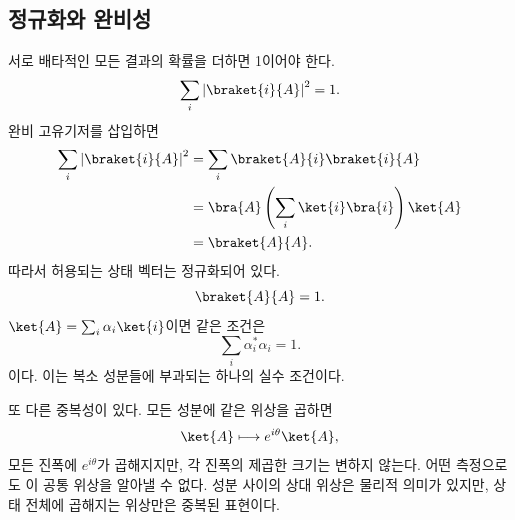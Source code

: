 \begin{classroomqa}\end{classroomqa}

\subsection{정규화와 완비성}

서로 배타적인 모든 결과의 확률을 더하면 1이어야 한다.
\begin{equation}
\sum_i\left|\braket{i}{A}\right|^2=1.
\label{eq:probability-normalization}
\end{equation}
완비 고유기저를 삽입하면
\begin{align}
\sum_i\left|\braket{i}{A}\right|^2
 &=\sum_i\braket{A}{i}\braket{i}{A}\\
 &=\bra{A}\left(\sum_i\ket{i}\bra{i}\right)\ket{A}\\
 &=\braket{A}{A}.
\end{align}
따라서 허용되는 상태 벡터는 정규화되어 있다.
\begin{equation}
\braket{A}{A}=1.
\label{eq:state-normalization}
\end{equation}
\(\ket{A}=\sum_i\alpha_i\ket{i}\)이면 같은 조건은
\begin{equation}
\sum_i\alpha_i^*\alpha_i=1.
\label{eq:component-normalization}
\end{equation}
이다. 이는 복소 성분들에 부과되는 하나의 실수 조건이다.

\begin{classroomqa}\end{classroomqa}

또 다른 중복성이 있다. 모든 성분에 같은 위상을 곱하면
\begin{equation}
\ket{A}\longmapsto e^{i\theta}\ket{A},
\label{eq:l3-global-phase}
\end{equation}
모든 진폭에 \(e^{i\theta}\)가 곱해지지만, 각 진폭의 제곱한 크기는 변하지 않는다. 어떤 측정으로도 이 공통 위상을 알아낼 수 없다. 성분 사이의 상대 위상은 물리적 의미가 있지만, 상태 전체에 곱해지는 위상만은 중복된 표현이다.

